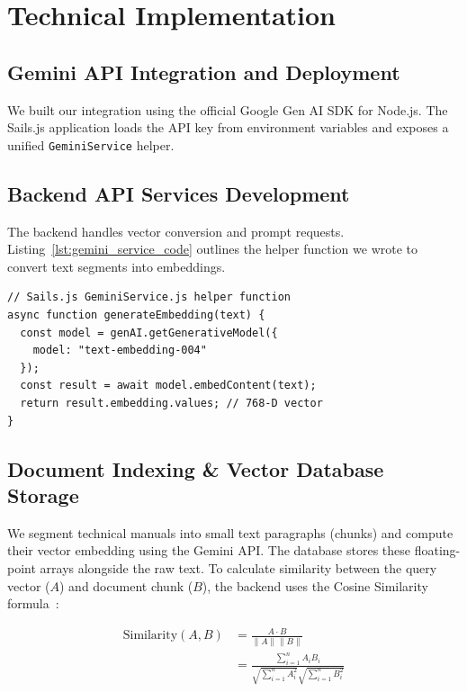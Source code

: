 \documentclass[12pt,a4paper]{report}
\begin{document}
\section{Technical Implementation}

\subsection{Gemini API Integration and Deployment}

\label{lst:gemini_service}
We built our integration using the official Google Gen AI SDK for Node.js. The Sails.js application loads the API key from environment variables and exposes a unified \texttt{GeminiService} helper.

\subsection{Backend API Services Development}

The backend handles vector conversion and prompt requests. Listing~\ref{lst:gemini_service_code} outlines the helper function we wrote to convert text segments into embeddings.

\begin{verbatim}
// Sails.js GeminiService.js helper function
async function generateEmbedding(text) {
  const model = genAI.getGenerativeModel({
    model: "text-embedding-004"
  });
  const result = await model.embedContent(text);
  return result.embedding.values; // 768-D vector
}
\end{verbatim}
\label{lst:gemini_service_code}

\subsection{Document Indexing \& Vector Database Storage}

We segment technical manuals into small text paragraphs (chunks) and compute their vector embedding using the Gemini API. The database stores these floating-point arrays alongside the raw text. To calculate similarity between the query vector ($A$) and document chunk ($B$), the backend uses the Cosine Similarity formula~\cite{manning2008}:

\begin{align}
\text{Similarity}(A, B) &= \frac{A \cdot B}{\|A\| \|B\|} \nonumber \\
&= \frac{\sum_{i=1}^{n} A_i B_i}{\sqrt{\sum_{i=1}^{n} A_i^2} \sqrt{\sum_{i=1}^{n} B_i^2}}
\label{eq:cosine_similarity}
\end{align}
\end{document}
